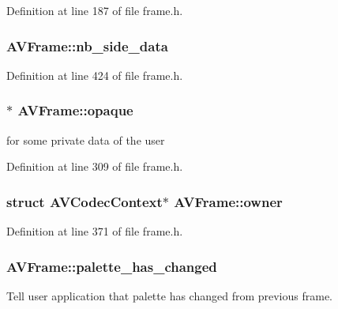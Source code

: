 Definition at line 187 of file frame.\+h.

\subsubsection[{\texorpdfstring{nb\+\_\+side\+\_\+data}{nb_side_data}}]{ A\+V\+Frame\+::nb\+\_\+side\+\_\+data}\hypertarget{struct_a_v_frame_a9061ffbfdbdfec29f2dbfc252c5569a7}{}\label{struct_a_v_frame_a9061ffbfdbdfec29f2dbfc252c5569a7}


Definition at line 424 of file frame.\+h.

\subsubsection[{\texorpdfstring{opaque}{opaque}}]{$\ast$ A\+V\+Frame\+::opaque}\hypertarget{struct_a_v_frame_a385d043b41cd182b7b1bdaec56ed19e0}{}\label{struct_a_v_frame_a385d043b41cd182b7b1bdaec56ed19e0}
for some private data of the user 

Definition at line 309 of file frame.\+h.

\subsubsection[{\texorpdfstring{owner}{owner}}]{ struct {\bf A\+V\+Codec\+Context}$\ast$ A\+V\+Frame\+::owner}\hypertarget{struct_a_v_frame_a2fa44ff6fd61c3f9c5f84ee8ba7b1426}{}\label{struct_a_v_frame_a2fa44ff6fd61c3f9c5f84ee8ba7b1426}


Definition at line 371 of file frame.\+h.

\subsubsection[{\texorpdfstring{palette\+\_\+has\+\_\+changed}{palette_has_changed}}]{ A\+V\+Frame\+::palette\+\_\+has\+\_\+changed}\hypertarget{struct_a_v_frame_a6144be38de30e80de331f435e61f5f4c}{}\label{struct_a_v_frame_a6144be38de30e80de331f435e61f5f4c}
Tell user application that palette has changed from previous frame. 


